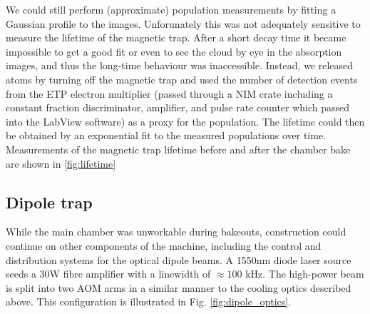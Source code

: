 	We could still perform (approximate) population measurements by fitting a Gaussian profile to the images.
	Unforunately this was not adequately sensitive to measure the lifetime of the magnetic trap.
	After a short decay time it became impossible to get a good fit or even to see the cloud by eye in the absorption images, and thus the long-time behaviour was inaccessible.
	Instead, we released atoms by turning off the magnetic trap and used the number of detection events from the ETP electron multiplier (passed through a NIM crate including a constant fraction discriminator, amplifier, and pulse rate counter which passed into the LabView software) as a proxy for the population.
	The lifetime could then be obtained by an exponential fit to the measured populations over time.
	Measurements of the magnetic trap lifetime before and after the chamber bake are shown in \ref{fig:lifetime}


	
	

\subsection{Dipole trap}
	While the main chamber was unworkable during bakeouts, construction could continue on other components of the machine, including the control and distribution systems for the optical dipole beams.
	A 1550nm diode laser source seeds a 30W fibre amplifier with a linewidth of $\approx100$ kHz.
	The high-power beam is split into two AOM arms in a similar manner to the cooling optics described above.
	This configuration is illustrated  in Fig.	\ref{fig:dipole_optics}.
	
